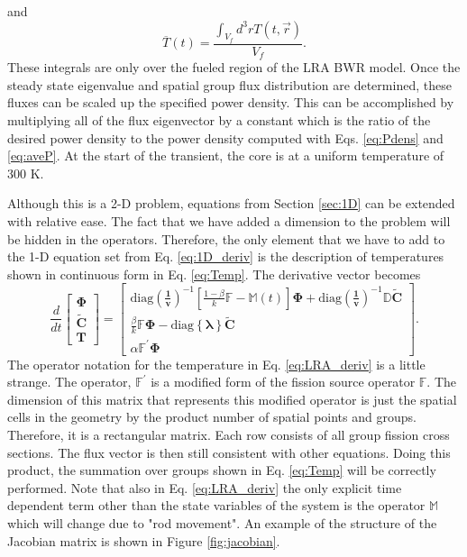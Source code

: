 \documentclass{ansconf}
\numberwithin{equation}{section}
\begin{document}
and
\begin{equation}
    \overline{T}\left(t\right) = \frac{\int_{V_f}d^3rT\left(t,\vec{r}\right)}{V_f}.
\end{equation}
These integrals are only over the fueled region of the LRA BWR model. Once the steady state eigenvalue and spatial group flux distribution are determined, these fluxes can be scaled up the specified power density.  This can be accomplished by multiplying all of the flux eigenvector by a constant which is the ratio of the desired power density to the power density computed with Eqs. \eqref{eq:Pdens} and \eqref{eq:aveP}. At the start of the transient, the core is at a uniform temperature of 300 K.

Although this is a 2-D problem, equations from Section \ref{sec:1D} can be extended with relative ease. The fact that we have added a dimension to the problem will be hidden in the operators. Therefore, the only element that we have to add to the 1-D equation set from Eq. \eqref{eq:1D_deriv} is the description of temperatures shown in continuous form in Eq. \eqref{eq:Temp}. The derivative vector becomes
\begin{equation}\label{eq:LRA_deriv}
    \frac{d}{dt}\left[\begin{array}{c}
    \boldsymbol{\Phi} \\ \widetilde{\boldsymbol{C}} \\ \boldsymbol{T}\end{array}\right] = 
    \left[\begin{array}{c}
    \mathrm{diag}\left(\boldsymbol{\frac{1}{v}}\right)^{-1}\left[\frac{1-\beta}{k}\mathbb{F} - \mathbb{M}\left(t\right)\right]\boldsymbol{\Phi} + \mathrm{diag}\left(\boldsymbol{\frac{1}{v}}\right)^{-1}\mathbb{D}\widetilde{\boldsymbol{C}} \\
    \frac{\beta}{k}\mathbb{F}\boldsymbol{\Phi} -  \mathrm{diag}\left\lbrace\boldsymbol{\lambda}\right\rbrace
    \widetilde{\boldsymbol{C}} \\
    \alpha \mathbb{F}^\prime\boldsymbol{\Phi}
    \end{array}\right].
\end{equation}
The operator notation for the temperature in Eq. \eqref{eq:LRA_deriv} is a little strange. The operator, $\mathbb{F}^\prime$ is a modified form of the fission source operator $\mathbb{F}$. The dimension of this matrix that represents this modified operator is just the spatial cells in the geometry by the product number of spatial points and groups. Therefore, it is a rectangular matrix. Each row consists of all group fission cross sections. The flux vector is then still consistent with other equations.  Doing this product, the summation over groups shown in Eq. \eqref{eq:Temp} will be correctly performed. Note that also in Eq. \eqref{eq:LRA_deriv} the only explicit time dependent term other than the state variables of the system is the operator $\mathbb{M}$ which will change due to "rod movement". An example of the structure of the Jacobian matrix is shown in Figure \ref{fig:jacobian}.
\end{document}
